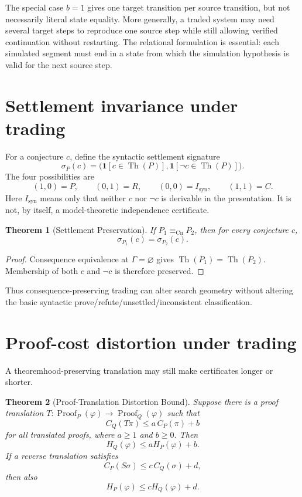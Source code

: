 \documentclass[11pt]{article}
\newtheorem{theorem}{Theorem}[section]
\theoremstyle{definition}
\theoremstyle{remark}
\newcommand{\Th}{\operatorname{Th}}
\newcommand{\Proof}{\operatorname{Proof}}
\newcommand{\equivCn}{\equiv_{\mathrm{Cn}}}
\begin{document}
The special case $b=1$ gives one target transition per source transition, but not necessarily literal state equality. More generally, a traded system may need several target steps to reproduce one source step while still allowing verified continuation without restarting. The relational formulation is essential: each simulated segment must end in a state from which the simulation hypothesis is valid for the next source step.

\section{Settlement invariance under trading}
For a conjecture $c$, define the syntactic settlement signature
\[
\sigma_P(c)=\bigl(\mathbf 1[c\in\Th(P)],\mathbf 1[\neg c\in\Th(P)]\bigr).
\]
The four possibilities are
\[
(1,0)=P,\qquad (0,1)=R,\qquad (0,0)=I_{\mathrm{syn}},\qquad (1,1)=C.
\]
Here $I_{\mathrm{syn}}$ means only that neither $c$ nor $\neg c$ is derivable in the presentation. It is not, by itself, a model-theoretic independence certificate.

\begin{theorem}[Settlement Preservation]
If $P_1\equivCn P_2$, then for every conjecture $c$,
\[
\sigma_{P_1}(c)=\sigma_{P_2}(c).
\]
\end{theorem}

\begin{proof}
Consequence equivalence at $\Gamma=\varnothing$ gives $\Th(P_1)=\Th(P_2)$. Membership of both $c$ and $\neg c$ is therefore preserved.
\end{proof}

Thus consequence-preserving trading can alter search geometry without altering the basic syntactic prove/refute/unsettled/inconsistent classification.

\section{Proof-cost distortion under trading}
A theoremhood-preserving translation may still make certificates longer or shorter.

\begin{theorem}[Proof-Translation Distortion Bound]\label{thm:distortion}
Suppose there is a proof translation $T:\Proof_P(\varphi)\to\Proof_Q(\varphi)$ such that
\[
C_Q(T\pi)\le a\,C_P(\pi)+b
\]
for all translated proofs, where $a\ge 1$ and $b\ge 0$. Then
\[
H_Q(\varphi)\le aH_P(\varphi)+b.
\]
If a reverse translation satisfies
\[
C_P(S\sigma)\le c\,C_Q(\sigma)+d,
\]
then also
\[
H_P(\varphi)\le cH_Q(\varphi)+d.
\]
\end{theorem}
\end{document}
